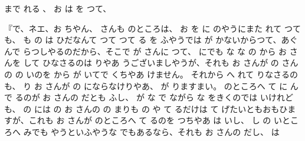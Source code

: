 まで
れる
、
お
は
を
つて、

『で、ネエ、お
ちやん、
さんも
のところは、
お
を
に
のやうにまた
れて
つても、
も
の
は
ひだなんて
つて
つて
る
を
ふやうでは
が
かないからつて、あぐんで
らつしやるのだから、そこで
が
さんに
つて、
にでも
な
な
の
から
お
さんを
して
ひなさるのは
りやあ
うございましやうが、それも
お
さんが
の
さんの
の
いのを
から
が
いてで
くちやあ
けません。
それから
へ
れて
りなさるのも、
り
お
さんが
の
にならなけりやあ、
が
りますまい。
のところへ
て
に
んで
るのが
お
さんの
だとも
ふし、
が
な
で
ながら
な
をきくのでは
いけれども、
の
には
の
お
さんの
の
まりも
の
や
て
るだけは
て
げたいともおもひますが、これも
お
さんが
のところへ
て
るのを
つちやあ
は
いし、
し
の
いところへ
みでも
やうといふやうな
でもあるなら、それも
お
さんの
だし、
は
